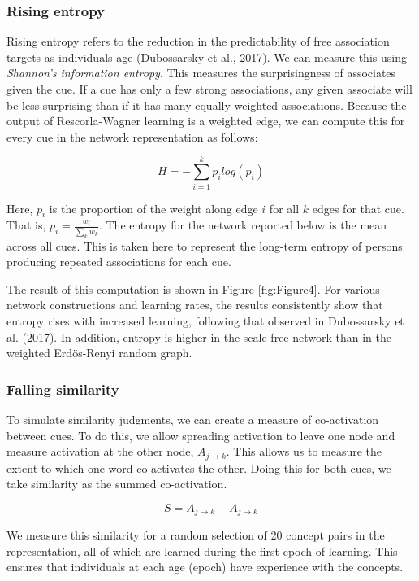 \documentclass[
  man,floatsintext]{apa6}
\begin{document}
\hypertarget{rising-entropy}{%
\subsubsection{Rising entropy}\label{rising-entropy}}

Rising entropy refers to the reduction in the predictability of free association targets as individuals age (Dubossarsky et al., 2017). We can measure this using \emph{Shannon's information entropy}. This measures the surprisingness of associates given the cue. If a cue has only a few strong associations, any given associate will be less surprising than if it has many equally weighted associations. Because the output of Rescorla-Wagner learning is a weighted edge, we can compute this for every cue in the network representation as follows:

\[
H = -\sum_{i=1}^{k}  p_i log(p_i)
\]

Here, \(p_i\) is the proportion of the weight along edge \(i\) for all \(k\) edges for that cue. That is, \(p_i = \frac{w_i}{\sum_k w_k}\). The entropy for the network reported below is the mean across all cues. This is taken here to represent the long-term entropy of persons producing repeated associations for each cue.

The result of this computation is shown in Figure \ref{fig:Figure4}. For various network constructions and learning rates, the results consistently show that entropy rises with increased learning, following that observed in Dubossarsky et al. (2017). In addition, entropy is higher in the scale-free network than in the weighted Erdös-Renyi random graph.

\hypertarget{falling-similarity}{%
\subsubsection{Falling similarity}\label{falling-similarity}}

To simulate similarity judgments, we can create a measure of co-activation between cues. To do this, we allow spreading activation to leave one node and measure activation at the other node, \(A_{j \rightarrow k}\). This allows us to measure the extent to which one word co-activates the other. Doing this for both cues, we take similarity as the summed co-activation.

\[
S = A_{j \rightarrow k} + A_{j \rightarrow k}
\]

We measure this similarity for a random selection of 20 concept pairs in the representation, all of which are learned during the first epoch of learning. This ensures that individuals at each age (epoch) have experience with the concepts.
\end{document}
